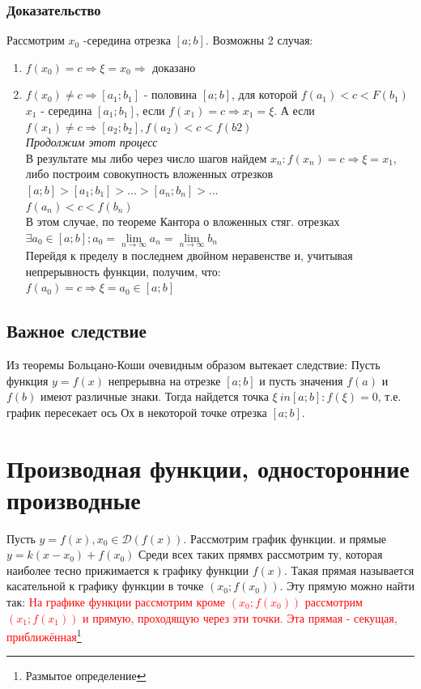 \documentclass[oneside]{book}
\begin{document}
\begin{enumerate}
\subsection{Доказательство}
Рассмотрим $x_0$ -середина отрезка $[a;b]$. Возможны 2 случая:
\begin{enumerate}
\item $f(x_0)=c \Rightarrow \xi=x_0 \Rightarrow$ доказано
\item $f(x_0)\neq c \Rightarrow [a_1;b_1]$ - половина $[a;b]$, для которой $f(a_1)<c<F(b_1)$
$x_1$ - середина $[a_1;b_1]$, если $f(x_1)=c\Rightarrow x_1=\xi$. А если $f(x_1)\neq c \Rightarrow [a_2; b_2], f(a_2)<c<f(b2)$
\\\textit{Продолжим этот процесс}\\
В результате мы либо через число шагов найдем $x_n:f(x_n)=c\Rightarrow \xi=x_1$, либо построим совокупность вложенных отрезков $[a;b]>[a_1;b_1]>...>[a_n;b_n]>...$\\
$f(a_n)<c<f(b_n)$\\
В этом случае, по теореме Кантора о вложенных стяг. отрезках $\exists a_0 \in [a;b]; a_0=\lim \limits_{n \rightarrow \infty}a_n=\lim \limits_{n \rightarrow \infty}b_n$\\
Перейдя к пределу в последнем двойном неравенстве и, учитывая непрерывность функции, получим, что:\\
$f(a_0)=c\Rightarrow \xi=a_0 \in [a;b]$
\end{enumerate}
\section{Важное следствие}
Из теоремы Больцано-Коши очевидным образом вытекает следствие:
Пусть функция $y=f(x)$ непрерывна на отрезке $[a;b]$ и пусть значения $f(a)$ и $f(b)$ имеют различные знаки. Тогда найдется точка $\xi \ in [a;b]: f(\xi)=0$, т.е. график пересекает ось Ох в некоторой точке отрезка $[a;b]$.

\setcounter{chapter}{16}
\chapter{Производная функции, односторонние производные}

Пусть $y = f(x), x_0 \in \mathcal{D}(f(x))$. Рассмотрим график функции. и  прямые $y = k(x - x_0) + f(x_0)$
Среди всех таких прямвх рассмотрим ту, которая наиболее тесно прижимается к графику функции $f(x)$.
Такая прямая называется касательной к графику функции в точке $(x_0; f(x_0))$. Эту прямую можно найти так:
\textcolor{red}{На графике функции рассмотрим кроме $(x_0; f(x_0))$ рассмотрим $(x_1; f(x_1))$ и прямую, проходящую через эти точки. Эта прямая - секущая, приближённая\footnote{Размытое определение}}


\end{enumerate}
\end{document}
